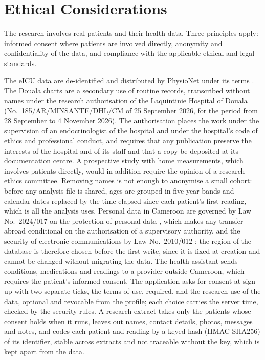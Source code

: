 \documentclass[11pt,a4paper,oneside]{report}
\begin{document}
\section{Ethical Considerations}\label{sec:ethics-considerations}\label{sec:ethics}\label{sec:legal}

The research involves real patients and their health data. Three principles apply: informed consent where patients are involved directly, anonymity and confidentiality of the data, and compliance with the applicable ethical and legal standards.

The eICU data are de-identified and distributed by PhysioNet under its terms \parencite{pollard2018,goldberger2000}. The Douala charts are a secondary use of routine records, transcribed without names under the research authorisation of the Laquintinie Hospital of Douala (No.~185/\allowbreak AR/\allowbreak MINSANTE/\allowbreak DHL/\allowbreak CM of 25 September 2026, for the period from 28 September to 4 November 2026). The authorisation places the work under the supervision of an endocrinologist of the hospital and under the hospital's code of ethics and professional conduct, and requires that any publication preserve the interests of the hospital and of its staff and that a copy be deposited at its documentation centre. A prospective study with home measurements, which involves patients directly, would in addition require the opinion of a research ethics committee. Removing names is not enough to anonymise a small cohort: before any analysis file is shared, ages are grouped in five-year bands and calendar dates replaced by the time elapsed since each patient's first reading, which is all the analysis uses. Personal data in Cameroon are governed by Law No.~2024/017 on the protection of personal data \parencite{cameroon2024data}, which makes any transfer abroad conditional on the authorisation of a supervisory authority, and the security of electronic communications by Law No.~2010/012 \parencite{cameroon2010cyber}; the region of the database is therefore chosen before the first write, since it is fixed at creation and cannot be changed without migrating the data. The health assistant sends conditions, medications and readings to a provider outside Cameroon, which requires the patient's informed consent. The application asks for consent at sign-up with two separate ticks, the terms of use, required, and the research use of the data, optional and revocable from the profile; each choice carries the server time, checked by the security rules. A research extract takes only the patients whose consent holds when it runs, leaves out names, contact details, photos, messages and notes, and codes each patient and reading by a keyed hash (HMAC-SHA256) of its identifier, stable across extracts and not traceable without the key, which is kept apart from the data.
\end{document}
